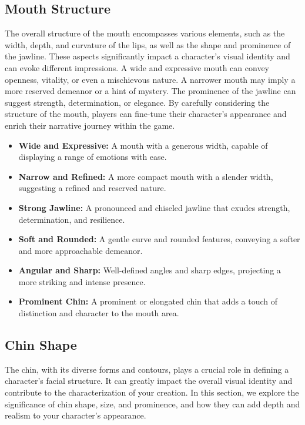 \documentclass[12pt]{book}  %
\begin{document}
\subsection{\textbf{Mouth Structure}}

The overall structure of the mouth encompasses various elements, such as the width, depth, and curvature of the lips, as well as the shape and prominence of the jawline. These aspects significantly impact a character's visual identity and can evoke different impressions. A wide and expressive mouth can convey openness, vitality, or even a mischievous nature. A narrower mouth may imply a more reserved demeanor or a hint of mystery. The prominence of the jawline can suggest strength, determination, or elegance. By carefully considering the structure of the mouth, players can fine-tune their character's appearance and enrich their narrative journey within the game.

\begin{itemize}
    \item \textbf{Wide and Expressive:} A mouth with a generous width, capable of displaying a range of emotions with ease.
    \item \textbf{Narrow and Refined:} A more compact mouth with a slender width, suggesting a refined and reserved nature.
    \item \textbf{Strong Jawline:} A pronounced and chiseled jawline that exudes strength, determination, and resilience.
    \item \textbf{Soft and Rounded:} A gentle curve and rounded features, conveying a softer and more approachable demeanor.
    \item \textbf{Angular and Sharp:} Well-defined angles and sharp edges, projecting a more striking and intense presence.
    \item \textbf{Prominent Chin:} A prominent or elongated chin that adds a touch of distinction and character to the mouth area.
\end{itemize}

\subsection{\textbf{Chin Shape}}

The chin, with its diverse forms and contours, plays a crucial role in defining a character's facial structure. It can greatly impact the overall visual identity and contribute to the characterization of your creation. In this section, we explore the significance of chin shape, size, and prominence, and how they can add depth and realism to your character's appearance.
\end{document}
